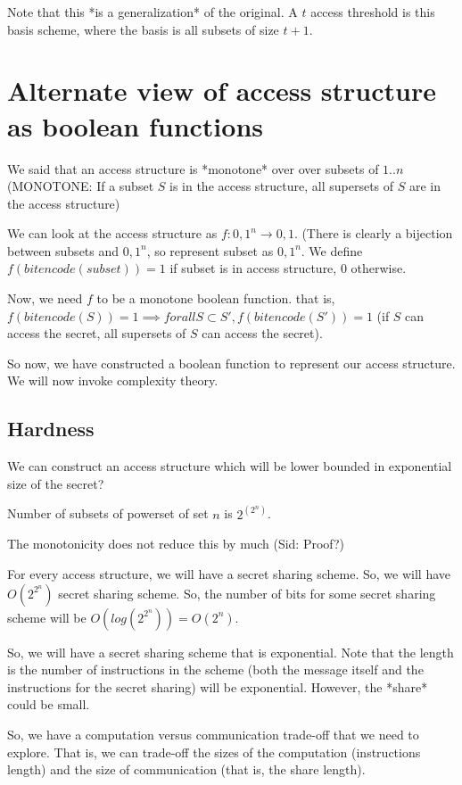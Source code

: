 Note that this *is a generalization* of the original. A $t$ access threshold is
this basis scheme, where the basis is all subsets of size $t + 1$.


\section{Alternate view of access structure as boolean functions}
We said that an access structure is *monotone* over over subsets of ${1..n}$ 
(MONOTONE: If a subset $S$ is in the access structure, all supersets of $S$
are in the access structure)


We can look at the access structure as $f: {0, 1}^n \rightarrow {0, 1}$. (There
is clearly a bijection between subsets and ${0, 1}^n$, so represent subset as
${0, 1}^n$. We define  $f(bitencode(subset)) = 1$ if subset is in access structure, $0$ otherwise.


Now, we need $f$ to be a monotone boolean function. that is,
$f(bitencode(S)) = 1 \implies forall S \subset S', f(bitencode(S')) = 1$ (if $S$ can access the secret,
all supersets of $S$ can access the secret).

So now, we have constructed a boolean function to represent our access structure.
We will now invoke complexity theory.

\subsection{Hardness}
We can construct an access structure which will be lower bounded in exponential
size of the secret?

Number of subsets of powerset of set $n$ is $2^(2^n)$.
 
The monotonicity does not reduce this by much (Sid: Proof?)

For every access structure, we will have a secret sharing scheme. So, we will
have $O(2^2^n)$ secret sharing scheme. So, the number of bits for some
secret sharing scheme will be $O(log(2^2^n)) = O(2^n)$.


So, we will  have a secret sharing scheme that is exponential. Note that
the length is the number of instructions in the scheme  (both the message itself
and the instructions for the secret sharing) will be exponential. However, the
*share* could be small.

So, we have a computation versus communication trade-off that we need to explore.
That is, we can trade-off the sizes of the computation (instructions length)
and the size of communication (that is, the share length).



